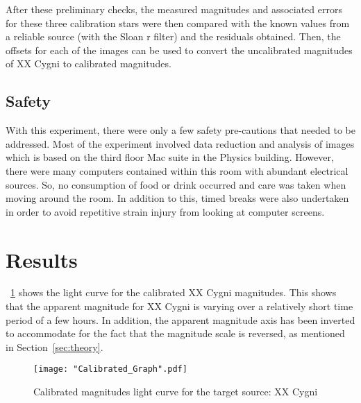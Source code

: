 \documentclass{article}
\newcommand{\figref}[2][\figurename~]{#1\ref{#2}}
\newcommand{\secref}[2][Section~]{#1\ref{#2}}
\begin{document}
\newpage
\noindent
After these preliminary checks, the measured magnitudes and associated errors for these three calibration stars were then compared with the known values from a reliable source (with the Sloan r filter) \cite{Web03} and the residuals obtained. Then, the offsets for each of the images can be used to convert the uncalibrated magnitudes of XX Cygni to calibrated magnitudes.


\newpage
\subsection{Safety}
\label{ssec:safety}

With this experiment, there were only a few safety pre-cautions that needed to be addressed. Most of the experiment involved data reduction and analysis of images which is based on the third floor Mac suite in the Physics building. However, there were many computers contained within this room with abundant electrical sources. So, no consumption of food or drink occurred and care was taken when moving around the room. In addition to this, timed breaks were also undertaken in order to avoid repetitive strain injury from looking at computer screens.

\newpage
\section{Results}
\label{sec:results}

\figref{fig:calibrated-graph} shows the light curve for the calibrated XX Cygni magnitudes. This shows that the apparent magnitude for XX Cygni is varying over a relatively short time period of a few hours. In addition, the apparent magnitude axis has been inverted to accommodate for the fact that the magnitude scale is reversed, as mentioned in \secref{sec:theory}.

\begin{figure}[h]
\centering
\texttt{[image: "Calibrated\_Graph".pdf]}
\caption{Calibrated magnitudes light curve for the target source: XX Cygni}
\label{fig:calibrated-graph}
\end{figure}
\end{document}

